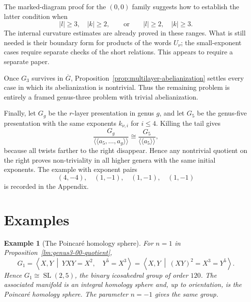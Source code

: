 \documentclass{article}
\newtheorem{example}[theorem]{Example}
\begin{document}
The marked-diagram proof for the $(0,0)$ family suggests how to establish
the latter condition when
\[
 |l|\geq3,\quad |k|\geq2,
 \qquad\text{or}\qquad
 |l|\geq2,\quad |k|\geq3.
\]
The internal curvature estimates are already proved in these ranges.  What
is still needed is their boundary form for products of the words $U_\nu$;
the small-exponent cases require separate checks of the short relations.
This appears to require a separate paper.

Once $G_3$ survives in $\overline G$,
Proposition~\ref{prop:multilayer-abelianization} settles every case in which
its abelianization is nontrivial.  Thus the remaining problem is entirely a
framed genus-three problem with trivial abelianization.

Finally, let $G_g$ be the $r$-layer presentation in genus $g$, and let $G_5$
be the genus-five presentation with the same exponents $k_{\nu,i}$ for
$i\leq4$.  Killing the tail gives
\[
 \frac{G_g}{\langle\!\langle a_5,\ldots,a_g\rangle\!\rangle}
 \cong
 \frac{G_5}{\langle\!\langle a_5\rangle\!\rangle},
\]
because all twists farther to the right disappear.  Hence any nontrivial
quotient on the right proves non-triviality in all higher genera with the
same initial exponents.  The example with exponent pairs
\[
 (4,-4),\quad(1,-1),\quad(1,-1),\quad(1,-1)
\]
is recorded in the Appendix.


\endgroup

\section{Examples}\label{sec:examples}
\begin{example}[The Poincar\'e homology sphere]
For $n=1$ in Proposition~\ref{lm:genus3-00-quotient},
\[
 G_1=\left\langle X,Y\ \middle|\
 YXY=X^2,\quad Y^5=X^3\right\rangle
 =\left\langle X,Y\ \middle|\ (XY)^2=X^3=Y^5\right\rangle.
\]
Hence $G_1\cong\operatorname{SL}(2,5)$, the binary icosahedral group of
order $120$.  The associated manifold is an integral homology sphere and,
up to orientation, is the Poincar\'e homology sphere.  The parameter
$n=-1$ gives the same group.
\end{example}
\end{document}
